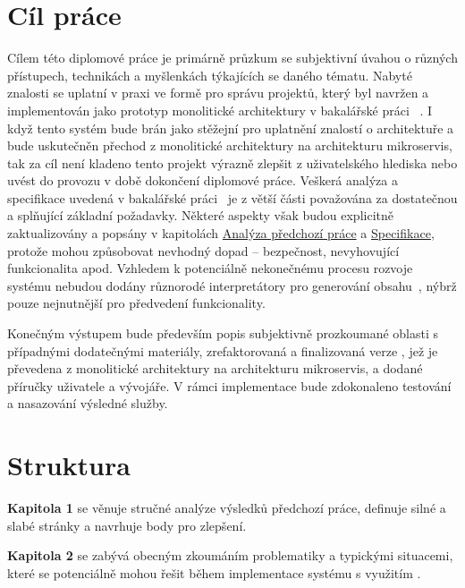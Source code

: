 \section{Cíl práce}\label{sec:cil-prace}
Cílem této diplomové práce je primárně průzkum  se subjektivní úvahou o různých přístupech, technikách a myšlenkách týkajících se daného tématu.
Nabyté znalosti se uplatní v praxi ve formě  pro správu projektů, který byl navržen a implementován jako prototyp monolitické architektury v bakalářské práci ~\cite{bachelorthesis}.
I když tento systém bude brán jako stěžejní pro uplatnění znalostí o architektuře a bude uskutečněn přechod z monolitické architektury na architekturu mikroservis, tak za cíl není kladeno tento projekt výrazně zlepšit z uživatelského hlediska nebo uvést do provozu v době dokončení diplomové práce.
Veškerá analýza a specifikace uvedená v bakalářské práci~\cite{bachelorthesis} je z větší části považována za dostatečnou a splňující základní požadavky.
Některé aspekty však budou explicitně zaktualizovány a popsány v kapitolách \hyperref[ch:analysis]{Analýza předchozí práce} a \hyperref[ch:specification]{Specifikace}, protože mohou způsobovat nevhodný dopad -- bezpečnost, nevyhovující funkcionalita apod.
Vzhledem k potenciálně nekonečnému procesu rozvoje systému nebudou dodány různorodé interpretátory pro generování obsahu~\cite{bachelorthesis}, nýbrž pouze nejnutnější pro předvedení funkcionality.

Konečným výstupem bude především popis subjektivně prozkoumané oblasti  s případnými dodatečnými materiály, zrefaktorovaná a finalizovaná verze , jež je převedena z monolitické architektury na architekturu mikroservis, a dodané příručky uživatele a vývojáře.
V rámci implementace bude zdokonaleno testování a nasazování výsledné služby.


\clearpage



\section{Struktura}\label{sec:struktura}

\textbf{Kapitola 1} se věnuje stručné analýze výsledků předchozí práce, definuje silné a slabé stránky a navrhuje body pro zlepšení.

\textbf{Kapitola 2} se zabývá obecným zkoumáním problematiky  a typickými situacemi, které se potenciálně mohou řešit během implementace systému s využitím .


